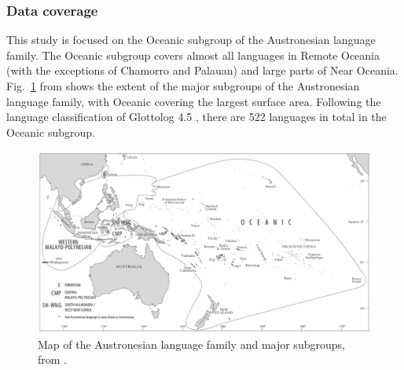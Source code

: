 \documentclass[12pt,letterpaper]{article}
\begin{document}

\FloatBarrier
\subsubsection{Data coverage} 
This study is focused on the Oceanic subgroup of the Austronesian language family. The Oceanic subgroup covers almost all languages in Remote Oceania (with the exceptions of Chamorro and Palauan) and large parts of Near Oceania. Fig.~\ref{Oceanic_map} from \citet[2]{protooceanicvol5} shows the extent of the major subgroups of the Austronesian language family, with Oceanic covering the largest surface area. Following the language classification of Glottolog 4.5 \citep{glottolog4_5}, there are 522 languages in total in the Oceanic subgroup.

\begin{figure}[ht]
\centering
\includegraphics[width=17cm]{illustrations/ross_pawley_osmond_protooceanic_vol5.png}
\caption{{Map of the Austronesian language family and major subgroups, from \citet[2]{protooceanicvol5}.}}
\label{Oceanic_map}
\end{figure} 
\end{document}
